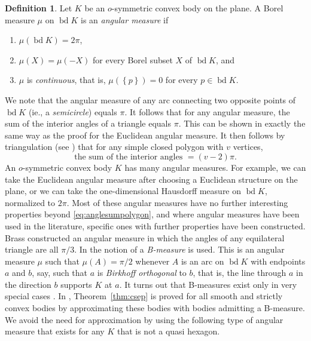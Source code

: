 \documentclass[a4paper,12pt]{article}
\theoremstyle{plain}
\theoremstyle{definition}
\newtheorem{definition}[theorem]{Definition}
\newcommand{\set}[1]{\left\{#1\right\}}
\DeclareMathOperator{\bd}{bd}
\begin{document}
\begin{definition}\label{def:angularmeasure}
Let $K$ be an $o$-symmetric convex body on the plane. A Borel measure $\mu$ on 
$\bd K$ is an \emph{angular measure} if
\begin{enumerate}
\item $\mu(\bd K)=2\pi$,
\item $\mu(X)=\mu(-X)$ 
for every Borel subset $X$ of $\bd K$, and
\item $\mu$ is \emph{continuous}, that is, 
$\mu(\set{p})=0$ for every $p\in \bd K$.
\end{enumerate}
\end{definition}

We note that the angular measure of any arc connecting two opposite points of $\bd K$ (ie., a 
\emph{semicircle}) equals $\pi$.
It follows that for any angular measure, the sum of the interior angles of a triangle equals $\pi$.
This can be shown in exactly the same way as the proof for the Euclidean angular measure.
It then follows by triangulation (see \cite{Br96}) that for any simple closed polygon 
with $v$ vertices, 
\begin{equation}\label{eq:anglesumpolygon}
\text{the sum of the interior angles }  = (v-2)\pi.
\end{equation}
An $o$-symmetric convex body $K$ has many angular measures.
For example, we can take the Euclidean angular measure after choosing a Euclidean structure on the plane, or we can take the one-dimensional Hausdorff measure on $\bd K$, normalized to $2\pi$.
Most of these angular measures have no further interesting properties beyond \eqref{eq:anglesumpolygon}, and where angular measures have been used in the literature, specific ones with further properties have been constructed.
Brass \cite{Br96} constructed an angular measure in which the angles of any equilateral triangle are all $\pi/3$.
In \cite{BKO} the notion of a \emph{B-measure} is used. This is an angular 
measure $\mu$ such that $\mu(A)=\pi/2$ whenever $A$ is an arc on $\bd K$ with 
endpoints $a$ and $b$, say, such that $a$ is \emph{Birkhoff orthogonal} to $b$, that 
is, the line through $a$ in the direction $b$ supports $K$ at $a$. It turns out 
that B-measures exist only in very special cases \cite{NPS20}.
In \cite{BKO}, Theorem~\ref{thm:csep} is proved for all smooth and strictly convex bodies by approximating these bodies with bodies admitting a B-measure.
We avoid the need for approximation by using the following type of angular measure that exists for any $K$ that is not a quasi hexagon.
\end{document}
